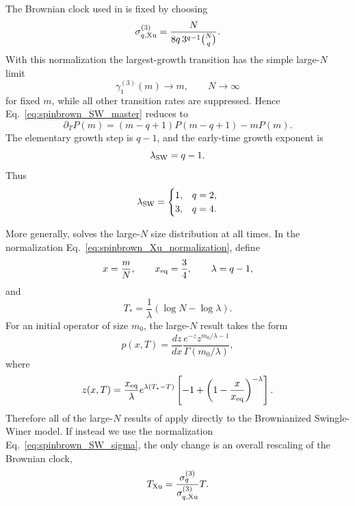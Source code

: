 \documentclass{article}
\theoremstyle{definition}
\begin{document}
The Brownian clock used in \cite{Xu2024} is fixed by choosing
\begin{equation}
    \sigma_{q,{\rm Xu}}^{(3)}
    =
    \frac{N}{
       8q\,3^{q-1}\binom{N}{q}
    }.
    \label{eq:spinbrown_Xu_normalization}
\end{equation}
With this normalization the largest-growth transition has the simple
large-$N$ limit
\begin{equation}
    \gamma_1^{(3)}(m)\longrightarrow m,
    \qquad
    N\rightarrow\infty
\end{equation}
for fixed $m$, while all other transition rates are suppressed.  Hence
Eq.~\eqref{eq:spinbrown_SW_master} reduces to
\begin{equation}
    \partial_TP(m)
    =
    (m-q+1)P(m-q+1)-mP(m).
    \label{eq:spinbrown_SW_early_master}
\end{equation}
The elementary growth step is $q-1$, and the early-time growth exponent is
\begin{equation}
    \lambda_{\rm SW}=q-1.
\end{equation}
Thus
\begin{equation}
    \lambda_{\rm SW}
    =
    \begin{cases}
    1, & q=2,\\
    3, & q=4.
    \end{cases}
\end{equation}

More generally, \cite{Xu2024} solves the large-$N$ size distribution at all
times.  In the normalization
Eq.~\eqref{eq:spinbrown_Xu_normalization}, define
\begin{equation}
    x=\frac{m}{N},
    \qquad
    x_{\rm eq}=\frac34,
    \qquad
    \lambda=q-1,
\end{equation}
and
\begin{equation}
    T_*
    =
    \frac{1}{\lambda}
    \left(
       \log N-\log\lambda
    \right).
\end{equation}
For an initial operator of size $m_0$, the large-$N$ result takes the form
\begin{equation}
    p(x,T)
    =
    \frac{dz}{dx}
    \frac{
       e^{-z}z^{m_0/\lambda-1}
    }{
       \Gamma(m_0/\lambda)
    },
    \label{eq:spinbrown_Xu_distribution}
\end{equation}
where
\begin{equation}
    z(x,T)
    =
    \frac{x_{\rm eq}}{\lambda}
    e^{\lambda(T_*-T)}
    \left[
       -1+
       \left(
          1-\frac{x}{x_{\rm eq}}
       \right)^{-\lambda}
    \right].
    \label{eq:spinbrown_Xu_z}
\end{equation}
Therefore all of the large-$N$ results of \cite{Xu2024} apply directly to
the Brownianized Swingle-Winer model.  If instead we use the normalization
Eq.~\eqref{eq:spinbrown_SW_sigma}, the only change is an overall rescaling
of the Brownian clock,
\begin{equation}
    T_{\rm Xu}
    =
    \frac{
       \sigma_q^{(3)}
    }{
       \sigma_{q,{\rm Xu}}^{(3)}
    }T .
    \label{eq:spinbrown_time_rescale}
\end{equation}
\end{document}
